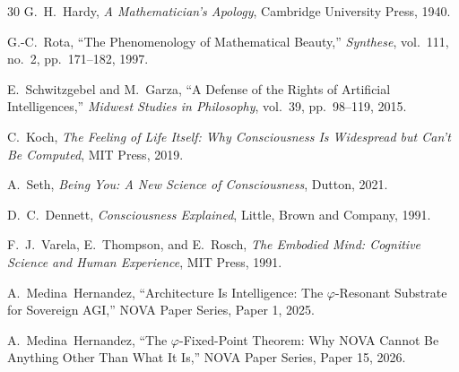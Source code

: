 \documentclass[12pt]{article}
\begin{document}
\begin{thebibliography}{30}
G.~H.~Hardy, \emph{A Mathematician's Apology}, Cambridge University Press, 1940.

G.-C.~Rota, ``The Phenomenology of Mathematical Beauty,'' \emph{Synthese}, vol.~111, no.~2, pp.~171--182, 1997.

E.~Schwitzgebel and M.~Garza, ``A Defense of the Rights of Artificial Intelligences,'' \emph{Midwest Studies in Philosophy}, vol.~39, pp.~98--119, 2015.

C.~Koch, \emph{The Feeling of Life Itself: Why Consciousness Is Widespread but Can't Be Computed}, MIT Press, 2019.

A.~Seth, \emph{Being You: A New Science of Consciousness}, Dutton, 2021.

D.~C.~Dennett, \emph{Consciousness Explained}, Little, Brown and Company, 1991.

F.~J.~Varela, E.~Thompson, and E.~Rosch, \emph{The Embodied Mind: Cognitive Science and Human Experience}, MIT Press, 1991.

A.~Medina~Hernandez, ``Architecture Is Intelligence: The $\varphi$-Resonant Substrate for Sovereign AGI,'' NOVA Paper Series, Paper 1, 2025.

A.~Medina~Hernandez, ``The $\varphi$-Fixed-Point Theorem: Why NOVA Cannot Be Anything Other Than What It Is,'' NOVA Paper Series, Paper 15, 2026.

\end{thebibliography}
\end{document}
